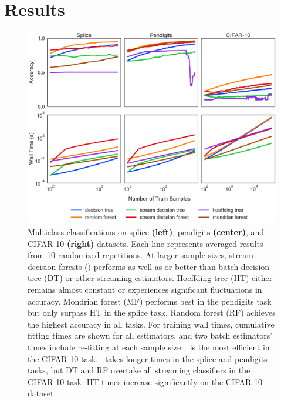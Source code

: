 \section{Results}
\label{results}

\begin{figure}[!htb]
\centering
\includegraphics[width=1.0\textwidth]{visual.pdf}
  \caption{Multiclass classifications on splice \textbf{(left)}, pendigits \textbf{(center)}, and CIFAR-10 \textbf{(right)} datasets. 
  Each line represents averaged results from 10 randomized repetitions. At larger sample sizes, stream decision forests (\SDF) performs as well as or better than batch decision tree (DT) or other streaming estimators. Hoeffding tree (HT) either remains almost constant or experiences significant fluctuations in accuracy. Mondrian forest (MF) performs best in the pendigits task but only surpass HT in the splice task. Random forest (RF) achieves the highest accuracy in all tasks.
  For training wall times, cumulative fitting times are shown for all estimators, and two batch estimators' times include re-fitting at each sample size. \SDT~is the most efficient in the CIFAR-10 task. \SDF~takes longer times in the splice and pendigits tasks, but DT and RF overtake all streaming classifiers in the CIFAR-10 task. HT times increase significantly on the CIFAR-10 dataset.
  }
\label{fig:visual}
\end{figure}

